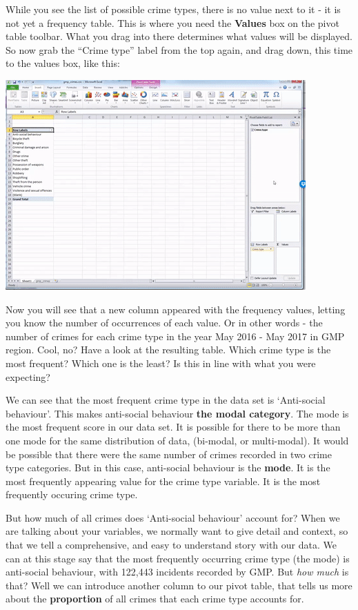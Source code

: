 \documentclass[
]{book}
\begin{document}
While you see the list of possible crime types, there is no value next to it - it is not yet a frequency table. This is where you need the \textbf{Values} box on the pivot table toolbar. What you drag into there determines what values will be displayed. So now grab the ``Crime type'' label from the top again, and drag down, this time to the values box, like this:

\includegraphics{imgs/ct_in_values.gif}

Now you will see that a new column appeared with the frequency values, letting you know the number of occurrences of each value. Or in other words - the number of crimes for each crime type in the year May 2016 - May 2017 in GMP region. Cool, no? Have a look at the resulting table. Which crime type is the most frequent? Which one is the least? Is this in line with what you were expecting?

We can see that the most frequent crime type in the data set is `Anti-social behaviour'. This makes anti-social behaviour \textbf{the modal category}. The mode is the most frequent score in our data set. It is possible for there to be more than one mode for the same distribution of data, (bi-modal, or multi-modal). It would be possible that there were the same number of crimes recorded in two crime type categories. But in this case, anti-social behaviour is the \textbf{mode}. It is the most frequently appearing value for the crime type variable. It is the most frequently occuring crime type.

But how much of all crimes does `Anti-social behaviour' account for? When we are talking about your variables, we normally want to give detail and context, so that we tell a comprehensive, and easy to understand story with our data. We can at this stage say that the most frequently occurring crime type (the mode) is anti-social behaviour, with 122,443 incidents recorded by GMP. But \emph{how much} is that? Well we can introduce another column to our pivot table, that tells us more about the \textbf{proportion} of all crimes that each crime type accounts for.
\end{document}
